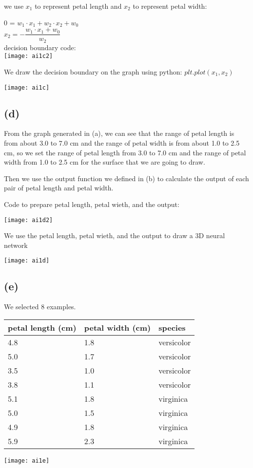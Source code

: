 \documentclass[11pt]{article}
\begin{document}
we use $x_1$ to represent petal length and $x_2$ to represent petal width: 

0 = $w_1 \cdot x_1 + w_2 \cdot x_2 + w_0$ \\

$x_2 = -\dfrac{w_1 \cdot x_1 + w_0}{w_2}$\\

decision boundary code:\\

\texttt{[image: ai1c2]}

We draw the decision boundary on the graph using python: $plt.plot(x_1, x_2)$

\texttt{[image: ai1c]}

\subsection*{(d)}

From the graph generated in (a), we can see that the range of petal length is from about 3.0 to 7.0 cm and the range of petal width is from about 1.0 to 2.5 cm,
so we set the range of petal length from 3.0 to 7.0 cm and the range of petal width from 1.0 to 2.5 cm for the surface that we are going to draw.

Then we use the output function we defined in (b) to calculate the output of each pair of petal length and petal width.

Code to prepare petal length, petal wieth, and the output:

\texttt{[image: ai1d2]}

We use the petal length, petal wieth, and the output to draw a 3D neural network

\texttt{[image: ai1d]}

\subsection*{(e)}

We selected 8 examples. 

\begin{tabular}{|l l l|}
    \hline
    petal length (cm) & petal width (cm) & species\\
    \hline
    4.8 & 1.8 & versicolor\\
    5.0 & 1.7 & versicolor\\
    3.5 & 1.0 & versicolor\\
    3.8 & 1.1 & versicolor\\
    5.1 & 1.8 & virginica \\
    5.0 & 1.5 & virginica \\
    4.9 & 1.8 & virginica \\
    5.9 & 2.3 & virginica \\
    \hline
\end{tabular}

\texttt{[image: ai1e]}
\end{document}
